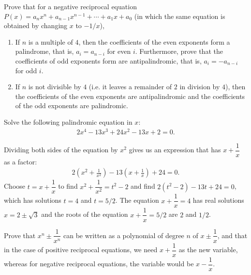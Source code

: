 \begin{tcolorbox}[title={Negative Reciprocal Equations}]
    \begin{question}
        Prove that for a negative reciprocal equation $P(x)=a_nx^n+a_{n-1}x^{n-1}+\cdots+a_1x+a_0$ (in which the same equation is obtained by changing $x$ to $-1/x$),
        \begin{enumerate}
            \item If $n$ is a multiple of $4$, then the coefficients of the even exponents form a palindrome, that is, $a_i=a_{n-i}$ for even $i$. Furthermore, prove that the coefficients of odd exponents form are antipalindromic, that is, $a_i=-a_{n-i}$ for odd $i$.
            \item If $n$ is not divisible by $4$ (i.e. it leaves a remainder of $2$ in division by $4$), then the coefficients of the even exponents are antipalindromic and the coefficients of the odd exponents are palindromic.
        \end{enumerate}
    \end{question}
\end{tcolorbox}


\begin{question}
    Solve the following palindromic equation in $x$:
    \begin{align*}
        2x^4-13x^3+24x^2-13x+2=0.
    \end{align*}
\end{question}

\begin{solution}
    Dividing both sides of the equation by $x^2$ gives us an expression that has $x+\dfrac{1}{x}$ as a factor:
    \begin{align*}
        2\left(x^2+\frac{1}{x^2}\right) - 13\left(x+\frac{1}{x}\right) + 24 = 0.
    \end{align*}
    Choose $t=x+\dfrac{1}{x}$ to find $x^2+\dfrac{1}{x^2}=t^2-2$ and find $2(t^2-2)-13t+24=0$, which has solutions $t=4$ and $t=5/2$. The equation $x+\dfrac{1}{x}=4$ has real solutions $x=2\pm \sqrt 3$ and the roots of the equation $x+\dfrac{1}{x}=5/2$ are $2$ and $1/2$. 
\end{solution}


\begin{question}
    Prove that $x^n\pm\dfrac{1}{x^n}$ can be written as a polynomial of degree $n$ of $x\pm \dfrac{1}{x}$, and that in the case of positive reciprocal equations, we need $x+\dfrac{1}{x}$ as the new variable, whereas for negative reciprocal equations, the variable would be $x-\dfrac{1}{x}$.
\end{question}

